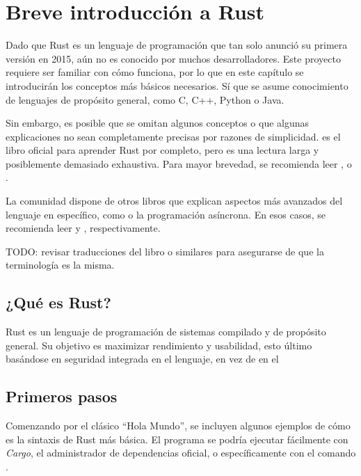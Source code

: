 
\chapter{Breve introducción a Rust}\label{ch:rust}

Dado que Rust es un lenguaje de programación que tan solo anunció su primera
versión en 2015, aún no es conocido por muchos desarrolladores. Este proyecto
requiere ser familiar con cómo funciona, por lo que en este capítulo se
introducirán los conceptos más básicos necesarios. Sí que se asume conocimiento
de lenguajes de propósito general, como C, C++, Python o Java.

Sin embargo, es posible que se omitan algunos conceptos o que algunas
explicaciones no sean completamente precisas por razones de simplicidad.
\textcite{rustfullbook} es el libro oficial para aprender Rust por completo,
pero es una lectura larga y posiblemente demasiado exhaustiva. Para mayor
brevedad, se recomienda leer \textcite{rustprofessionals},
\textcite{rustgentleintro} o \textcite{rust30min}.

La comunidad dispone de otros libros que explican aspectos más avanzados del
lenguaje en específico, como \unsafe o la programación asíncrona. En esos casos,
se recomienda leer \textcite{rustnomicon} y \textcite{rustasyncbook},
respectivamente.

TODO: revisar traducciones del libro o similares para asegurarse de que la
terminología es la misma.

\section{¿Qué es Rust?}

Rust es un lenguaje de programación de sistemas compilado y de propósito
general. Su objetivo es maximizar rendimiento y usabilidad, esto último
basándose en seguridad integrada en el lenguaje, en vez de en el \

\section{Primeros pasos}

Comenzando por el clásico ``Hola Mundo'', se incluyen algunos ejemplos de cómo
es la sintaxis de Rust más básica. El programa se podría ejecutar fácilmente con
\emph{Cargo}, el administrador de dependencias oficial, o específicamente con el
comando .


